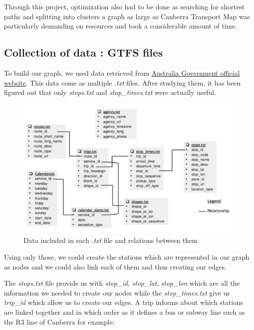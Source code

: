 \documentclass{article}
\begin{document}
	Through this project, optimization also had to be done as searching for shortest paths and splitting into clusters a graph as large as Canberra Transport Map was particularly demanding on resources and took a considerable amount of time.
	
\subsection{Collection of data : GTFS files}
	
	To build our graph, we used data retrieved from \href{https://www.transport.act.gov.au/contact-us/information-for-developers}{Australia Government official website}. This data come as multiple \textit{.txt} files. After studying them, it has been figured out that only \textit{stops.txt} and \textit{stop\_times.txt} were actually useful.
	
\begin{figure}[h]
\begin{center}
	\includegraphics[scale=1]{assets/data}
\end{center} 
\caption{Data included in each \textit{.txt} file and relations between them}
\end{figure} 


	Using only those, we could create the stations which are represented in our graph as nodes and we could also link each of them and thus creating our edges.
	
\newpage
	
	The \textit{stops.txt} file provide us with \textit{stop\_id},  \textit{stop\_lat}, \textit{stop\_lon} which are all the information we needed to create our nodes while the \textit{stop\_times.txt} give us \textit{trip\_id} which allow us to create our edges. A trip informs about which stations are linked together and in which order as it defines a bus or subway line such as the R3 line of Canberra for example:
	
\end{document}
